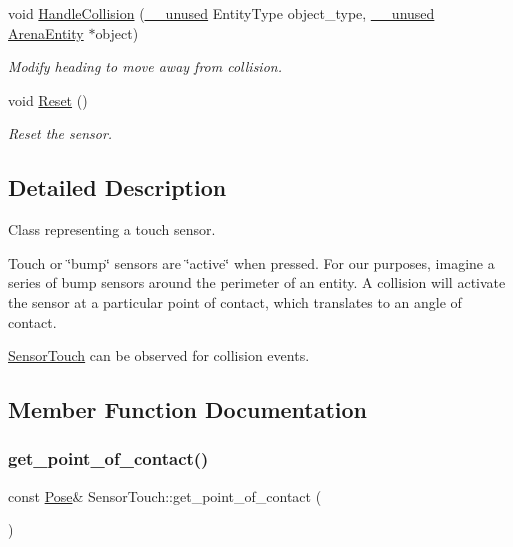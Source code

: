 \begin{DoxyCompactItemize}
\mbox{\label{class_sensor_touch_a1980b126f7c6d0e6bdf75f1bb59fe5c2}} 
void \mbox{\hyperlink{class_sensor_touch_a1980b126f7c6d0e6bdf75f1bb59fe5c2}{Handle\+Collision}} (\mbox{\hyperlink{common_8h_a2e3484535ee610c8e19e9859563abe48}{\+\_\+\+\_\+unused}} Entity\+Type object\+\_\+type, \mbox{\hyperlink{common_8h_a2e3484535ee610c8e19e9859563abe48}{\+\_\+\+\_\+unused}} \mbox{\hyperlink{class_arena_entity}{Arena\+Entity}} $\ast$object)
\begin{DoxyCompactList}\small\item\em Modify heading to move away from collision. \end{DoxyCompactList}\item 
\mbox{\label{class_sensor_touch_ad0054916c97844a51052e5dee63f68b9}} 
void \mbox{\hyperlink{class_sensor_touch_ad0054916c97844a51052e5dee63f68b9}{Reset}} ()
\begin{DoxyCompactList}\small\item\em Reset the sensor. \end{DoxyCompactList}\end{DoxyCompactItemize}


\subsection{Detailed Description}
Class representing a touch sensor. 

Touch or \char`\"{}bump\char`\"{} sensors are \char`\"{}active\char`\"{} when pressed. For our purposes, imagine a series of bump sensors around the perimeter of an entity. A collision will activate the sensor at a particular point of contact, which translates to an angle of contact.

\mbox{\hyperlink{class_sensor_touch}{Sensor\+Touch}} can be observed for collision events. 

\subsection{Member Function Documentation}
\mbox{\label{class_sensor_touch_a9f56fd943758125611863ce2bc0d9365}} 
\subsubsection{\texorpdfstring{get\+\_\+point\+\_\+of\+\_\+contact()}{get\_point\_of\_contact()}}
{\footnotesize\ttfamily const \mbox{\hyperlink{struct_pose}{Pose}}\& Sensor\+Touch\+::get\+\_\+point\+\_\+of\+\_\+contact (\begin{DoxyParamCaption}{ }\end{DoxyParamCaption})\hspace{0.3cm}{\ttfamily [inline]}}



